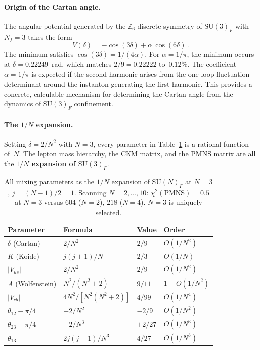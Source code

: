 \documentclass[12pt,a4paper]{article}
\newcommand{\SU}{\mathrm{SU}}
\newcommand{\Nf}{N_{\!f}}
\begin{document}
\paragraph{Origin of the Cartan angle.}
The angular potential generated by the $\mathbb{Z}_6$ discrete symmetry
of $\SU(3)_F$ with $\Nf = 3$ takes the form
\begin{equation}
  V(\delta) = -\cos(3\delta) + \alpha\,\cos(6\delta)\,.
  \label{eq:angular_potential}
\end{equation}
The minimum satisfies $\cos(3\delta) = 1/(4\alpha)$.
For $\alpha = 1/\pi$, the minimum occurs at
$\delta = 0.22249$~rad, which matches $2/9 = 0.22222$
to~$0.12\%$.
The coefficient $\alpha = 1/\pi$ is expected if the second
harmonic arises from the one-loop fluctuation determinant
around the instanton generating the first harmonic.
This provides a concrete, calculable mechanism for determining
the Cartan angle from the dynamics of $\SU(3)_F$ confinement.

\paragraph{The $1/N$ expansion.}
Setting $\delta = 2/N^2$ with $N = 3$,
every parameter in Table~\ref{tab:1overN} is a rational function of~$N$.
The lepton mass hierarchy, the CKM matrix, and the PMNS matrix
are all the \textbf{$1/N$ expansion of $\SU(3)_F$}.

\begin{table}[h]
\centering
\begin{tabular}{llll}
\hline
Parameter & Formula & Value & Order \\
\hline
$\delta$ (Cartan) & $2/N^2$ & $2/9$ & $O(1/N^2)$ \\
$K$ (Koide) & $j(j{+}1)/N$ & $2/3$ & $O(1/N)$ \\
$|V_{us}|$ & $2/N^2$ & $2/9$ & $O(1/N^2)$ \\
$A$ (Wolfenstein) & $N^2/(N^2{+}2)$ & $9/11$ & $1{-}O(1/N^2)$ \\
$|V_{cb}|$ & $4N^2/[N^2(N^2{+}2)]$ & $4/99$ & $O(1/N^4)$ \\
$\theta_{12} - \pi/4$ & $-2/N^2$ & $-2/9$ & $O(1/N^2)$ \\
$\theta_{23} - \pi/4$ & $+2/N^3$ & $+2/27$ & $O(1/N^3)$ \\
$\theta_{13}$ & $2j(j{+}1)/N^3$ & $4/27$ & $O(1/N^3)$ \\
\hline
\end{tabular}
\caption{All mixing parameters as the $1/N$ expansion of $\SU(N)_F$
  at $N = 3$, $j = (N{-}1)/2 = 1$.
  Scanning $N = 2,\ldots,10$: $\chi^2(\mathrm{PMNS}) = 0.5$ at $N=3$
  versus $604$ ($N{=}2$), $218$ ($N{=}4$). $N = 3$ is uniquely selected.}
\label{tab:1overN}
\end{table}
\end{document}
